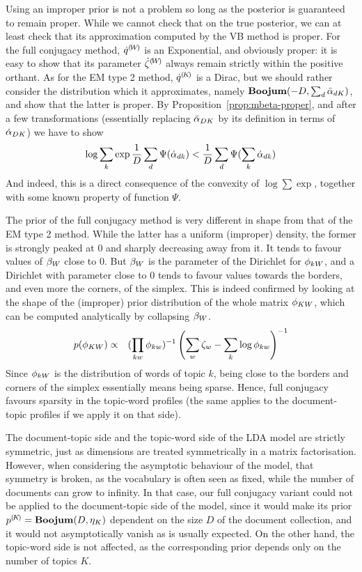 Using an improper prior is not a problem so long as the posterior is guaranteed to remain proper. While we cannot check that on the true posterior, we can at least check that its approximation computed by the VB method is proper. For the full conjugacy method, ${\dot{q}}^{(\!{W}\!)}$ is an Exponential, and obviously proper: it is easy to show that its parameter ${\dot{\zeta}}^{(\!{W}\!)}$ always remain strictly within the positive orthant. As for the EM type 2 method, ${\dot{q}}^{(\!{K}\!)}$ is a Dirac, but we should rather consider the distribution which it approximates, namely $\mathbf{Boojum}(-D,\sum_d\bar{\alpha}_{dK})$, and show that the latter is proper. By Proposition~\ref{prop:mbeta-proper}, and after a few transformations (essentially replacing $\bar{\alpha}_{DK}$ by its definition in terms of $\dot{\alpha}_{DK}$) we have to show
\[
\log\sum_k\exp\frac{1}{D}\sum_d\Psi(\dot{\alpha}_{dk})<\frac{1}{D}\sum_{d}\Psi(\sum_k\dot{\alpha}_{dk})
\]
And indeed, this is a direct consequence of the convexity of $\log\sum\exp$, together with some known property of function $\Psi$.

The prior of the full conjugacy method is very different in shape from that of the EM type 2 method. While the latter has a uniform (improper) density, the former is strongly peaked at $0$ and sharply decreasing away from it. It tends to favour values of $\beta_W$ close to $0$. But $\beta_W$ is the parameter of the Dirichlet for $\phi_{kW}$, and a Dirichlet with parameter close to 0 tends to favour values towards the borders, and even more the corners, of the simplex. This is indeed confirmed by looking at the shape of the (improper) prior distribution of the whole matrix $\phi_{KW}$, which can be computed analytically by collapsing $\beta_W$.
\begin{eqnarray*}
p(\phi_{KW}) & \propto & (\prod_{kw}\phi_{kw})^{-1}\left(\sum_w\zeta_w-\sum_k\log\phi_{kw}\right)^{-1}
\end{eqnarray*}
Since $\phi_{kW}$ is the distribution of words of topic $k$, being close to the borders and corners of the simplex essentially means being sparse. Hence, full conjugacy favours sparsity in the topic-word profiles (the same applies to the document-topic profiles if we apply it on that side).

The document-topic side and the topic-word side of the LDA model are strictly symmetric, just as dimensions are treated symmetrically in a matrix factorisation. However, when considering the asymptotic behaviour of the model, that symmetry is broken, as the vocabulary is often seen as fixed, while the number of documents can grow to infinity. In that case, our full conjugacy variant could not be applied to the document-topic side of the model, since it would make its prior ${p}^{(\!{K}\!)}=\mathbf{Boojum}(D,\eta_K)$ dependent on the size $D$ of the document collection, and it would not asymptotically vanish as is usually expected. On the other hand, the topic-word side is not affected, as the corresponding prior depends only on the number of topics $K$.